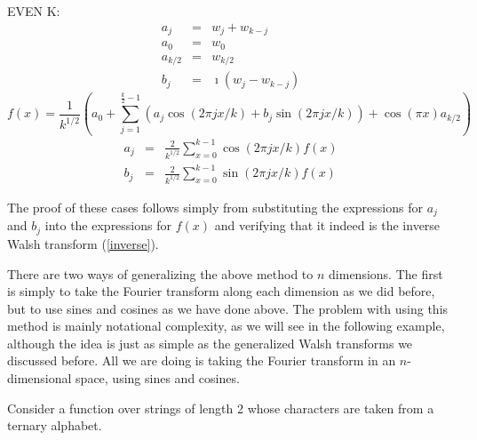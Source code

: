 EVEN K:
\begin{eqnarray}
a_j &=& w_j + w_{k-j} \nonumber \\
a_0 &=& w_0 \nonumber \\
a_{k/2} &=& w_{k/2} \nonumber \\
b_j &=& \imath (w_j - w_{k-j})
\end{eqnarray}
\begin{equation}
f(x)=\frac{1}{k^{1/2}}(a_0+\sum_{j=1}^{\frac{k}{2}-1}{(a_j \cos(2 \pi j x/k) + 
	b_j \sin(2 \pi j x/k))}
	+\cos(\pi x) a_{k/2})
\end{equation}
\begin{eqnarray}
a_j &=& \frac{2}{k^{1/2}} \sum_{x=0}^{k-1} {\cos(2 \pi j x/k) f(x)} \nonumber \\
b_j &=& \frac{2}{k^{1/2}} \sum_{x=0}^{k-1} {\sin(2 \pi j x/k) f(x)}
\end{eqnarray}

The proof of these cases follows simply from substituting the expressions
for $a_j$ and $b_j$ into the expressions for $f(x)$ and verifying that it
indeed is the inverse Walsh transform (\ref{inverse}).

There are two ways of generalizing the above method to $n$ dimensions.
The first is simply to take the Fourier transform along each dimension
as we did before, but to use sines and cosines as we have done above.
The problem with using this method is mainly notational complexity, as
we will see in the following example, although the idea is just as simple
as the generalized Walsh transforms we discussed before.  All we are
doing is taking the Fourier transform in an $n$-dimensional space, using
sines and cosines.

Consider a function over strings of length 2 whose characters are taken
from a ternary alphabet.

